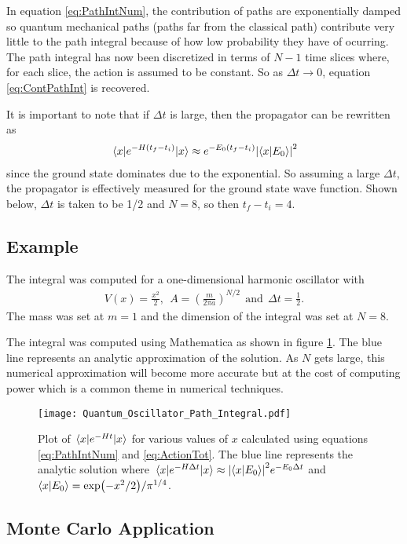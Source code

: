 \documentclass[11pt]{article}
\begin{document}
In equation \ref{eq:PathIntNum}, the contribution of paths are exponentially damped so quantum mechanical paths (paths far from the classical path) contribute very little to the path integral because of how low probability they have of ocurring. The path integral has now been discretized in terms of $N-1$ time slices where, for each slice, the action is assumed to be constant. So as $\Delta t\to0$, equation \ref{eq:ContPathInt} is recovered.

It is important to note that if $\Delta t$ is large, then the propagator can be rewritten as
\begin{align}
	\mel{x}{e^{-H(t_f-t_i)}}{x}\approx e^{-E_0(t_f-t_i)}\abs{\bra{x}\ket{E_0}}^2
\end{align}
since the ground state dominates due to the exponential. So assuming a large $\Delta t$, the propagator is effectively measured for the ground state wave function. Shown below, $\Delta t$ is taken to be 1/2 and $N=8$, so then $t_f-t_i=4$.

\subsection{Example}
The integral was computed for a one-dimensional harmonic oscillator with
\begin{align}
V(x)=\frac{x^2}{2},\ \ A=\left(\frac{m}{2\pi a}\right)^{N/2}\ \ \text{and}\ \ \Delta t=\frac{1}{2}.
\end{align}
The mass was set at $m=1$ and the dimension of the integral was set at $N=8$. 

The integral was computed using Mathematica as shown in figure \ref{fig:QHO}. The blue line represents an analytic approximation of the solution. As $N$ gets large, this numerical approximation will become more accurate but at the cost of computing power  which is a common theme in numerical techniques. 
\begin{figure}[h]
	\centering
	\texttt{[image: Quantum\_Oscillator\_Path\_Integral.pdf]}
	\caption{Plot of $\mel{x}{e^{-Ht}}{x}$ for various values of $x$ calculated using equations \ref{eq:PathIntNum} and \ref{eq:ActionTot}. The blue line represents the analytic solution where $\mel{x}{e^{-H\Delta t}}{x}\approx\abs{\bra{x}\ket{E_0}}^2e^{-E_0\Delta t}$ and $\bra{x}\ket{E_0}=\exp(-x^2/2)/\pi^{1/4}$.}
	\label{fig:QHO}
\end{figure}

\subsection{Monte Carlo Application}
\end{document}
